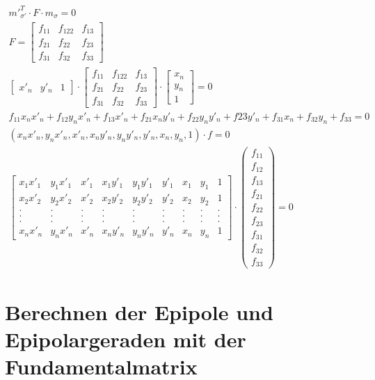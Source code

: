 \begin{gather}
{m'}_{\sigma'}^T \cdot F \cdot m_\sigma =0\\
F=\begin{bmatrix}
f_{11}&f_{122}&f_{13}\\
f_{21}&f_{22}&f_{23}\\
f_{31}&f_{32}&f_{33}
\end{bmatrix}\\
\begin{bmatrix}
x'_n&y'_n&1
\end{bmatrix} 
\cdot
\begin{bmatrix}
f_{11}&f_{122}&f_{13}\\
f_{21}&f_{22}&f_{23}\\
f_{31}&f_{32}&f_{33}
\end{bmatrix}
\cdot
\begin{bmatrix}
x_n\\y_n\\1
\end{bmatrix} =0\\
f_{11}x_nx'_n+f_{12}y_nx'_n+f_{13}x'_n+f_{21}x_ny'_n+f_{22}y_ny'_n+f{23}y'_n+f_{31}x_n+f_{32}y_n+f_{33} =0\\
(x_nx'_n,y_nx'_n,x'_n,x_ny'_n,y_ny'_n,y'_n,x_n,y_n,1)\cdot f =0\\
\begin{bmatrix}
x_1x'_1&y_1x'_1&x'_1&x_1y'_1&y_1y'_1&y'_1&x_1&y_1&1\\
x_2x'_2&y_2x'_2&x'_2&x_2y'_2&y_2y'_2&y'_2&x_2&y_2&1\\
.&.&.&.&.&.&.&.&.\\
.&.&.&.&.&.&.&.&.\\
.&.&.&.&.&.&.&.&.\\
x_nx'_n&y_nx'_n&x'_n&x_ny'_n&y_ny'_n&y'_n&x_n&y_n&1
\end{bmatrix}
\cdot 
\begin{pmatrix}
f_{11}\\f_{12}\\f_{13}\\f_{21}\\f_{22}\\f_{23}\\f_{31}\\f_{32}\\f_{33}
\end{pmatrix}
= 0
\end{gather}


\section{Berechnen der Epipole und Epipolargeraden mit der Fundamentalmatrix}


